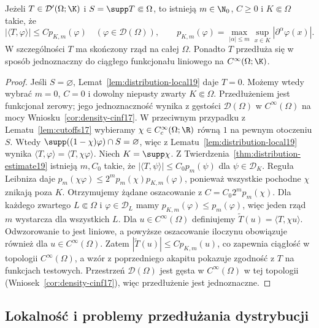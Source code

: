 \begin{twierdzenie}
\label{thm:compact-support-order19}
Jeżeli $T\in\mathcal D'(\Omega;\K)$ i
$S=\supp T\Subset\Omega$, to istnieją
$m\in\N_0$, $C\ge0$ i $K\Subset\Omega$ takie, że
\[|\langle T,\varphi\rangle|\le C p_{K,m}(\varphi)
\quad(\varphi\in\mathcal D(\Omega)),\qquad
p_{K,m}(\varphi)=\max_{|\alpha|\le m}
\sup_{x\in K}|\partial^\alpha\varphi(x)|.\]
W szczególności $T$ ma skończony rząd na całej $\Omega$.
Ponadto $T$ przedłuża się w sposób jednoznaczny do
ciągłego funkcjonału liniowego na $C^\infty(\Omega;\K)$.
\end{twierdzenie}
\begin{proof}
Jeśli $S=\varnothing$, Lemat~\ref{lem:distribution-local19}
daje $T=0$. Możemy wtedy wybrać $m=0$, $C=0$
i dowolny niepusty zwarty $K\Subset\Omega$.
Przedłużeniem jest funkcjonał zerowy; jego jednoznaczność
wynika z gęstości $\mathcal D(\Omega)$ w $C^\infty(\Omega)$
na mocy Wniosku~\ref{cor:density-cinf17}.
W przeciwnym przypadku z Lematu~\ref{lem:cutoffs17}
wybieramy $\chi\in C_c^\infty(\Omega;\R)$ równą $1$
na pewnym otoczeniu $S$. Wtedy
$\supp((1-\chi)\varphi)\cap S=\varnothing$, więc z
Lematu~\ref{lem:distribution-local19} wynika
$\langle T,\varphi\rangle=\langle T,\chi\varphi\rangle$.
Niech $K=\supp\chi$. Z Twierdzenia~\ref{thm:distribution-estimate19}
istnieją $m,C_0$ takie, że
$|\langle T,\psi\rangle|\le C_0p_m(\psi)$ dla
$\psi\in\mathcal D_K$. Reguła Leibniza daje
$p_m(\chi\varphi)\le 2^m p_m(\chi)p_{K,m}(\varphi)$,
ponieważ wszystkie pochodne $\chi$ znikają poza $K$.
Otrzymujemy żądane oszacowanie z $C=C_0 2^m p_m(\chi)$.
Dla każdego zwartego $L\Subset\Omega$ i $\varphi\in\mathcal D_L$
mamy $p_{K,m}(\varphi)\le p_m(\varphi)$,
więc jeden rząd $m$ wystarcza dla wszystkich $L$.
Dla $u\in C^\infty(\Omega)$ definiujemy
$\widetilde T(u)=\langle T,\chi u\rangle$.
Odwzorowanie to jest liniowe, a powyższe oszacowanie
iloczynu obowiązuje również dla $u\in C^\infty(\Omega)$.
Zatem $|\widetilde T(u)|\le C p_{K,m}(u)$,
co zapewnia ciągłość w topologii $C^\infty(\Omega)$, a wzór z poprzedniego akapitu
pokazuje zgodność z $T$ na funkcjach testowych.
Przestrzeń $\mathcal D(\Omega)$ jest gęsta w
$C^\infty(\Omega)$ w tej topologii (Wniosek~\ref{cor:density-cinf17}),
więc przedłużenie jest jednoznaczne.
\end{proof}

\subsection{Lokalność i problemy przedłużania dystrybucji}


